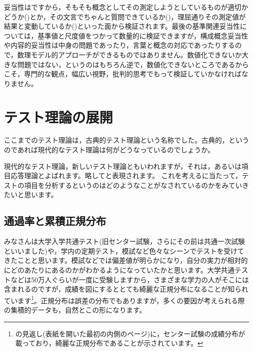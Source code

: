 \documentclass{ltjsbook}
\begin{document}
妥当性はですから，そもそも概念としてその測定しようとしているものが適切かどうか()とか，その文言でちゃんと質問できているか()，理屈通りその測定値が結果と変動しているか()といった面から検証されます。最後の基準関連妥当性については，基準値と尺度値をつかって数量的に検証できますが，構成概念妥当性や内容的妥当性は中身の問題であったり，言葉と概念の対応であったりするので，数理モデル的アプローチができるものではありません。数値化できないか大きな問題ではない，というのはもちろん逆で，数値化できないところであるからこそ，専門的な観点，幅広い視野，批判的思考でもって検証していかなければなりません。


\section{テスト理論の展開}
\label{NewTestTheory}
ここまでのテスト理論は，古典的テスト理論という名称でした。古典的，というのであれば現代的なテスト理論は何がどうなっているのでしょうか。

現代的なテスト理論，新しいテスト理論ともいわれますが，それは，あるいは項目応答理論とよばれます。略してと表現されます。
これを考えるに当たって，テストの項目を分析するというのはどのようなことがなされているのかをみていきたいと思います。

\subsection{通過率と累積正規分布}
みなさんは大学入学共通テスト(旧センター試験，さらにその前は共通一次試験といいました)や，学内の定期テスト，模試など色々なシーンでテストを受けてきたことと思います。模試などでは偏差値が明らかになり，自分の実力が相対的にどのあたりにあるのかがわかるようになっていたかと思います。大学共通テストなどは50万人ぐらいが一度に受験しますから，さまざまな学力の人がそこには含まれるのですが，成績を図にするととても綺麗な正規分布になることが知られています\footnote{\textcite{Yamauchi201001}の見返し(表紙を開いた最初の内側のページ)に，センター試験の成績分布が載っており，綺麗な正規分布であることが示されています。}。正規分布は誤差の分布でもありますが，多くの要因が考えられる際の集積的データも，自然とこの形になります。
\end{document}
